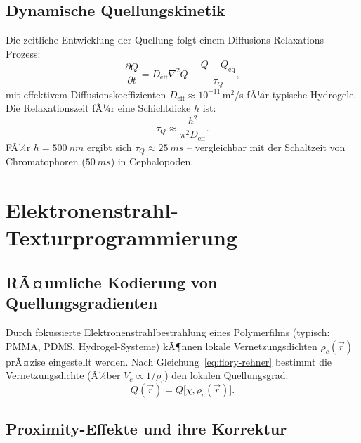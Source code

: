 ﻿\documentclass[a4paper,12pt]{scrreprt}
\theoremstyle{definition}
\begin{document}
\subsection{Dynamische Quellungskinetik}

Die zeitliche Entwicklung der Quellung folgt einem Diffusions-Relaxations-Prozess:
\begin{equation}
  \frac{\partial Q}{\partial t} = D_\mathrm{eff} \nabla^2 Q - \frac{Q - Q_\mathrm{eq}}{\tau_Q},
\end{equation}
mit effektivem Diffusionskoeffizienten $D_\mathrm{eff} \approx 10^{-11}$\,m$^2$/s
fÃ¼r typische Hydrogele. Die Relaxationszeit fÃ¼r eine Schichtdicke $h$ ist:
\begin{equation}
  \tau_Q \approx \frac{h^2}{\pi^2 D_\mathrm{eff}}.
\end{equation}
FÃ¼r $h = \SI{500}{nm}$ ergibt sich $\tau_Q \approx \SI{25}{ms}$ -- vergleichbar
mit der Schaltzeit von Chromatophoren ($\SI{50}{ms}$) in Cephalopoden.

\section{Elektronenstrahl-Texturprogrammierung}

\subsection{RÃ¤umliche Kodierung von Quellungsgradienten}

Durch fokussierte Elektronenstrahlbestrahlung eines Polymerfilms (typisch:
PMMA, PDMS, Hydrogel-Systeme) kÃ¶nnen lokale Vernetzungsdichten $\rho_c(\vec{r})$
prÃ¤zise eingestellt werden. Nach Gleichung~\eqref{eq:flory-rehner} bestimmt die
Vernetzungsdichte (Ã¼ber $V_c \propto 1/\rho_c$) den lokalen Quellungsgrad:
\begin{equation}
  Q(\vec{r}) = Q\bigl[\chi, \rho_c(\vec{r})\bigr].
\end{equation}

\subsection{Proximity-Effekte und ihre Korrektur}
\end{document}
